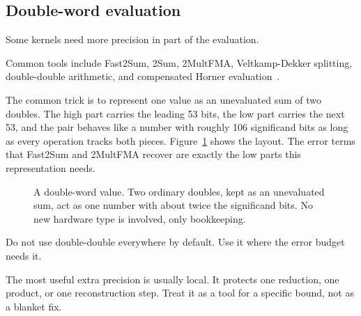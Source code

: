 \documentclass[manuscript, nonacm]{acmart}
\begin{document}
    \subsection{Double-word evaluation}

    Some kernels need more precision in part of the evaluation.

    Common tools include Fast2Sum, 2Sum, 2MultFMA, Veltkamp-Dekker splitting,
    double-double arithmetic, and compensated Horner evaluation~\cite{muller,handbook}.

    The common trick is to represent one value as an unevaluated sum of two
    doubles. The high part carries the leading 53 bits, the low part carries
    the next 53, and the pair behaves like a number with roughly 106
    significand bits as long as every operation tracks both pieces.
    Figure~\ref{fig:doubleword} shows the layout. The error terms that
    Fast2Sum and 2MultFMA recover are exactly the low parts this
    representation needs.

    \begin{figure}[tbp]
        \centering
        \caption{A double-word value. Two ordinary doubles, kept as an
        unevaluated sum, act as one number with about twice the significand
        bits. No new hardware type is involved, only bookkeeping.}
        \label{fig:doubleword}
    \end{figure}

    Do not use double-double everywhere by default. Use it where the error
    budget needs it.

    The most useful extra precision is usually local. It protects one reduction,
    one product, or one reconstruction step. Treat it as a tool for a specific
    bound, not as a blanket fix.
\end{document}
